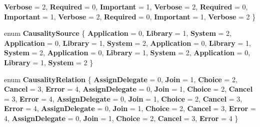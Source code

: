 \begin{DoxyCompactItemize}
{\bfseries Verbose} = 2, 
{\bfseries Required} = 0, 
{\bfseries Important} = 1, 
\newline
{\bfseries Verbose} = 2, 
{\bfseries Required} = 0, 
{\bfseries Important} = 1, 
{\bfseries Verbose} = 2, 
\newline
{\bfseries Required} = 0, 
{\bfseries Important} = 1, 
{\bfseries Verbose} = 2
 \}
\item 
\mbox{\label{namespace_windows_1_1_foundation_1_1_diagnostics_a3a370b356cb758e027ffea6414919c72}} 
enum {\bfseries Causality\+Source} \{ \newline
{\bfseries Application} = 0, 
{\bfseries Library} = 1, 
{\bfseries System} = 2, 
{\bfseries Application} = 0, 
\newline
{\bfseries Library} = 1, 
{\bfseries System} = 2, 
{\bfseries Application} = 0, 
{\bfseries Library} = 1, 
\newline
{\bfseries System} = 2, 
{\bfseries Application} = 0, 
{\bfseries Library} = 1, 
{\bfseries System} = 2, 
\newline
{\bfseries Application} = 0, 
{\bfseries Library} = 1, 
{\bfseries System} = 2
 \}
\item 
\mbox{\label{namespace_windows_1_1_foundation_1_1_diagnostics_a45d3c9f2fddbec91a3035d3e79a246c8}} 
enum {\bfseries Causality\+Relation} \{ \newline
{\bfseries Assign\+Delegate} = 0, 
{\bfseries Join} = 1, 
{\bfseries Choice} = 2, 
{\bfseries Cancel} = 3, 
\newline
{\bfseries Error} = 4, 
{\bfseries Assign\+Delegate} = 0, 
{\bfseries Join} = 1, 
{\bfseries Choice} = 2, 
\newline
{\bfseries Cancel} = 3, 
{\bfseries Error} = 4, 
{\bfseries Assign\+Delegate} = 0, 
{\bfseries Join} = 1, 
\newline
{\bfseries Choice} = 2, 
{\bfseries Cancel} = 3, 
{\bfseries Error} = 4, 
{\bfseries Assign\+Delegate} = 0, 
\newline
{\bfseries Join} = 1, 
{\bfseries Choice} = 2, 
{\bfseries Cancel} = 3, 
{\bfseries Error} = 4, 
\newline
{\bfseries Assign\+Delegate} = 0, 
{\bfseries Join} = 1, 
{\bfseries Choice} = 2, 
{\bfseries Cancel} = 3, 
\newline
{\bfseries Error} = 4
 \}
\item 
\mbox{\label{namespace_windows_1_1_foundation_1_1_diagnostics_a63986dc9acde6ceb9a128207a5bd1e56}} 

\end{DoxyCompactItemize}
